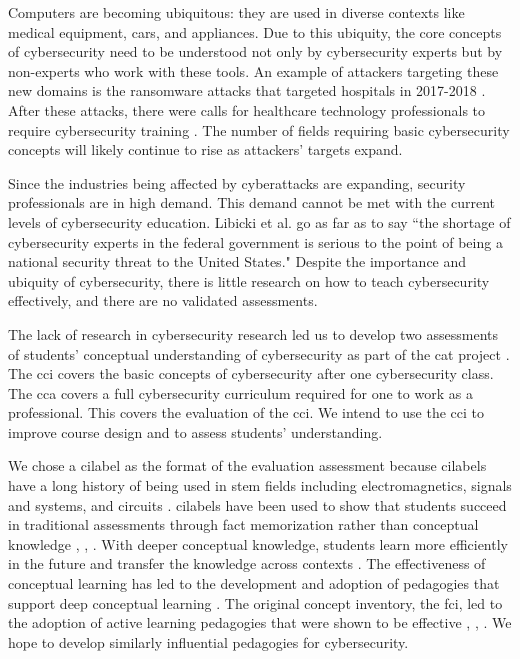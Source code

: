 Computers are becoming ubiquitous: they are used in diverse contexts like medical equipment, cars, and appliances. Due to this ubiquity, the core concepts of cybersecurity need to be understood not only by cybersecurity experts but by non-experts who work with these tools. An example of attackers targeting these new domains is the ransomware attacks that targeted hospitals in 2017-2018 \cite{ransomware}. After these attacks, there were calls for healthcare technology professionals to require cybersecurity training \cite{htm}. The number of fields requiring basic cybersecurity concepts will likely continue to rise as attackers' targets expand.

Since the industries being affected by cyberattacks are expanding, security professionals are in high demand. This demand cannot be met with the current levels of cybersecurity education. Libicki et al. \cite{hackers_wanted} go as far as to say ``the shortage of cybersecurity experts in the federal government is serious to the point of being a national security threat to the United States." Despite the importance and ubiquity of cybersecurity, there is little research on how to teach cybersecurity effectively, and there are no validated assessments. 


The lack of research in cybersecurity research led us to develop two assessments of students' conceptual understanding of cybersecurity as part of the \gls{cat} project \cite{workforce}. The \gls{cci} covers the basic concepts of cybersecurity after one cybersecurity class. The \gls{cca} covers a full cybersecurity curriculum required for one to work as a professional. This \DocTitle covers the evaluation of the \gls{cci}. We intend to use the \gls{cci} to improve course design and to assess students' understanding.


We chose a \gls{cilabel} as the format of the evaluation assessment because \glspl{cilabel} have a long history of being used in \gls{stem} fields including electromagnetics, signals and systems, and circuits \cite{ci_progress}. \glspl{cilabel} have been used to show that students succeed in traditional assessments through fact memorization rather than conceptual knowledge \cite{hake}, \cite{fci}, \cite{litzinger}. With deeper conceptual knowledge, students learn more efficiently in the future and transfer the knowledge across contexts \cite{litzinger}. The effectiveness of conceptual learning has led to the development and adoption of pedagogies that support deep conceptual learning \cite{dlci}. The original concept inventory, the \gls{fci}, led to the adoption of active learning pedagogies that were shown to be effective \cite{hake}, \cite{fci}, \cite{evans}. We hope to develop similarly influential pedagogies for cybersecurity.



